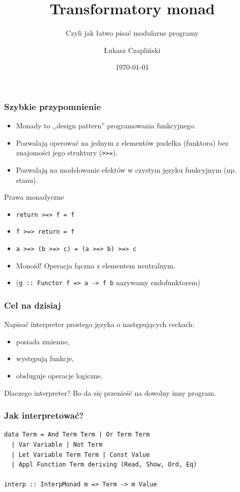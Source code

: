 \documentclass{beamer}
\title{Transformatory monad}
\subtitle{Czyli jak łatwo pisać modularne programy}
\author{Łukasz Czapliński}
\date{\today}
\begin{document}
\maketitle

\begin{frame}[fragile] %
  \frametitle{Szybkie przypomnienie}
    \begin{itemize}
      \item Monady to ,,design pattern'' programowania funkcyjnego.
      \item Pozwalają operować na jednym z elementów pudełka (funktora) bez
                    znajomości jego struktury (\texttt{>>=}).
      \item Pozwalają na modelowanie efektów w czystym języku funkcyjnym (np. stanu).
    \end{itemize}
\end{frame}

\begin{frame}{Prawa monadyczne}
  \begin{itemize}
    \item \texttt{return >=> f = f}
    \item \texttt{f >=> return = f}
    \item \texttt{a >=> (b >=> c) = (a >=> b) >=> c}
    \pause
    \item Monoid! Operacja łączna z elementem neutralnym.
    \item (\texttt{g :: Functor f => a -> f b} nazywamy endofunktorem)
  \end{itemize}
\end{frame}


\begin{frame} %
  \frametitle{Cel na dzisiaj}
  Napisać interpreter prostego języka o następujących cechach:
  \begin{itemize}
    \item posiada zmienne,
    \item występują funkcje,
    \item obsługuje operacje logiczne.
  \end{itemize}
  Dlaczego interpreter? Bo da się przenieść na dowolny inny program.
\end{frame}

\begin{frame}[fragile] %
  \frametitle{Jak interpretować?}
\begin{lstlisting}
data Term = And Term Term | Or Term Term 
  | Var Variable | Not Term 
  | Let Variable Term Term | Const Value
  | Appl Function Term deriving (Read, Show, Ord, Eq)

interp :: InterpMonad m => Term -> m Value
\end{lstlisting}
\end{frame}
\end{document}
